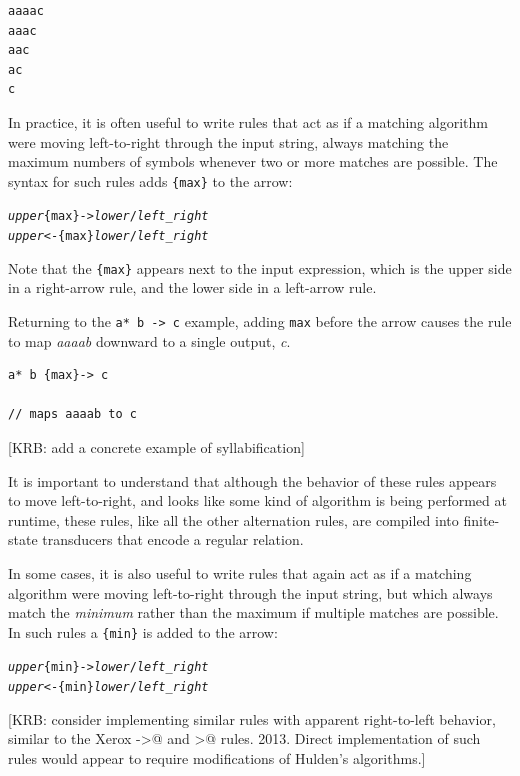 \begin{Verbatim}
aaaac
aaac
aac
ac
c
\end{Verbatim}


In practice, it is often useful to write rules that act as
if a matching algorithm were moving left-to-right through the input string, always matching the
	maximum numbers of symbols whenever two or more matches are possible.  The syntax for such rules
	adds \verb!{max}! to the arrow:

\begin{alltt}
\emph{upper} \{max\}-> \emph{lower} / \emph{left} _ \emph{right}
\emph{upper} <-\{max\} \emph{lower} / \emph{left} _ \emph{right}
\end{alltt}

\noindent
Note that the \verb!{max}! appears next to the input expression, which is the upper side in a right-arrow rule, and the lower side
in a left-arrow rule.

Returning to the \verb!a* b -> c! example, adding \verb!max! before the arrow causes the rule to map
\emph{aaaab} downward to a single output, \emph{c}.

\begin{Verbatim}
a* b {max}-> c

// maps aaaab to c
\end{Verbatim}


[KRB: add a concrete example of syllabification]  

It is important to understand that although the behavior of these rules appears to move
left-to-right, and looks like some kind of algorithm is being performed at runtime, these
rules, like all the other alternation rules, are compiled into finite-state transducers
that encode a regular relation.

In some cases, it is also useful to write rules that again act as if a matching algorithm
were moving left-to-right through the input string, but which always match the
\emph{minimum} rather than the maximum if multiple matches are possible.  In such rules a
\verb!{min}! is added to the arrow:

\begin{alltt}
\emph{upper} \{min\}-> \emph{lower} / \emph{left} _ \emph{right}
\emph{upper} <-\{min\} \emph{lower} / \emph{left} _ \emph{right}
\end{alltt}

[KRB:  consider implementing similar rules with apparent right-to-left
behavior, similar to the Xerox ->@ and >@ rules.  2013.  Direct
implementation of such rules would appear to require modifications of
Hulden's algorithms.]

